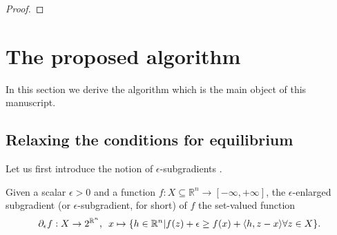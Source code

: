 \documentclass[envcountsame]{llcns2e/llncs}
\begin{document}
\begin{proof}
\end{proof}



\section{The proposed algorithm}
\label{sec:algo}
In this section we derive the algorithm which is the main object of
this manuscript.

\subsection{Relaxing the conditions for equilibrium}
Let us first introduce the notion of $\epsilon$-subgradients
\cite{he2013accelerating}.

\begin{definition}
Given a scalar $\epsilon > 0$ and a function $f:X \subseteq \mathbb{R}^n
\rightarrow [-\infty,+\infty]$, the $\epsilon$-enlarged subgradient (or
$\epsilon$-subgradient, for short) of $f$ the set-valued function
\begin{eqnarray}
\partial_\epsilon f: X \rightarrow 2^{\mathbb{R}^n}, \hspace{.5em} x
\mapsto \{h \in \mathbb{R}^n | f(z) + \epsilon \ge f(x) + \langle h, z
- x\rangle \forall z \in X\}.
\end{eqnarray}
\end{definition}
\end{document}
